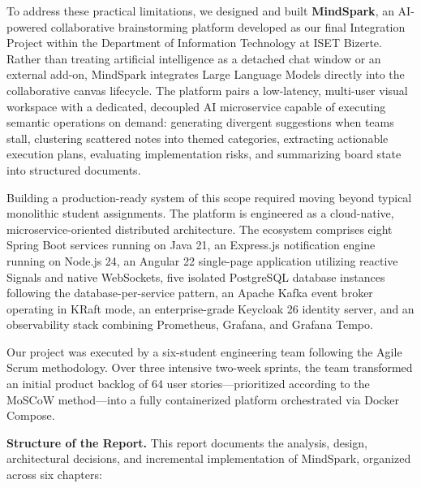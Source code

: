 \noindent To address these practical limitations, we designed and built \textbf{MindSpark}, an AI-powered collaborative brainstorming platform developed as our final Integration Project within the Department of Information Technology at ISET Bizerte. Rather than treating artificial intelligence as a detached chat window or an external add-on, MindSpark integrates Large Language Models directly into the collaborative canvas lifecycle. The platform pairs a low-latency, multi-user visual workspace with a dedicated, decoupled AI microservice capable of executing semantic operations on demand: generating divergent suggestions when teams stall, clustering scattered notes into themed categories, extracting actionable execution plans, evaluating implementation risks, and summarizing board state into structured documents.

Building a production-ready system of this scope required moving beyond typical monolithic student assignments. The platform is engineered as a cloud-native, microservice-oriented distributed architecture. The ecosystem comprises eight Spring Boot services running on Java 21, an Express.js notification engine running on Node.js 24, an Angular 22 single-page application utilizing reactive Signals and native WebSockets, five isolated PostgreSQL database instances following the database-per-service pattern, an Apache Kafka event broker operating in KRaft mode, an enterprise-grade Keycloak 26 identity server, and an observability stack combining Prometheus, Grafana, and Grafana Tempo.

Our project was executed by a six-student engineering team following the Agile Scrum methodology. Over three intensive two-week sprints, the team transformed an initial product backlog of 64 user stories---prioritized according to the MoSCoW method---into a fully containerized platform orchestrated via Docker Compose.

\bigskip
\noindent\textbf{Structure of the Report.} This report documents the analysis, design, architectural decisions, and incremental implementation of MindSpark, organized across six chapters:

